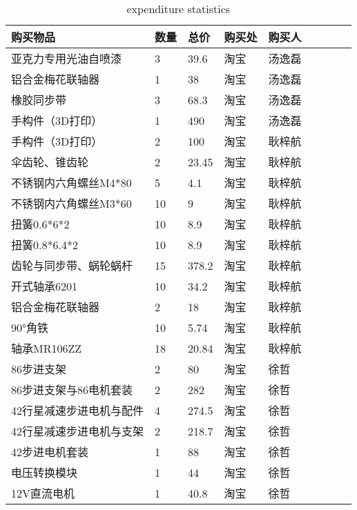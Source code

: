 
\begin{table}
    \centering
    \caption{expenditure statistics}
    \begin{tabular}{|l|l|l|l|l|l|l|l|l|}
    \hline
    
    购买物品 & 数量 & 总价 & 购买处 &购买人   \\ \hline
    亚克力专用光油自喷漆 & 3 & 39.6 & 淘宝 & 汤逸磊  \\ \hline
    铝合金梅花联轴器 & 1 & 38 & 淘宝  & 汤逸磊  \\ \hline
    橡胶同步带 & 3 & 68.3 & 淘宝  & 汤逸磊   \\ \hline
    手构件（3D打印） & 1 & 490 & 淘宝  & 汤逸磊   \\ \hline
    手构件（3D打印） & 2 & 100 & 淘宝  & 耿梓航   \\ \hline
    伞齿轮、锥齿轮 & 2 & 23.45 & 淘宝  & 耿梓航  \\ \hline
    不锈钢内六角螺丝M4*80 & 5 & 4.1 & 淘宝  & 耿梓航   \\ \hline
    不锈钢内六角螺丝M3*60 & 10 & 9 & 淘宝  & 耿梓航   \\ \hline
    扭簧0.6*6*2 & 10 & 8.9 & 淘宝  & 耿梓航   \\ \hline
    扭簧0.8*6.4*2 & 10 & 8.9 & 淘宝  & 耿梓航   \\ \hline
    齿轮与同步带、蜗轮蜗杆 & 15 & 378.2 & 淘宝  & 耿梓航   \\ \hline
    开式轴承6201 & 10 & 34.2 & 淘宝  & 耿梓航   \\ \hline
    铝合金梅花联轴器 & 2 & 18 & 淘宝  & 耿梓航   \\ \hline
    90°角铁 & 10 & 5.74 & 淘宝  & 耿梓航   \\ \hline
    轴承MR106ZZ & 18 & 20.84 & 淘宝  & 耿梓航   \\ \hline
    86步进支架 & 2 & 80 & 淘宝  & 徐哲   \\ \hline
    86步进支架与86电机套装 & 2 & 282 & 淘宝  & 徐哲  \\ \hline
    42行星减速步进电机与配件 & 4 & 274.5 & 淘宝  & 徐哲   \\ \hline
    42行星减速步进电机与支架 & 2 & 218.7 & 淘宝  & 徐哲   \\ \hline
    42步进电机套装 & 1 & 88 & 淘宝  & 徐哲   \\ \hline
    电压转换模块 & 1 & 44 & 淘宝  & 徐哲   \\ \hline
    12V直流电机 & 1 & 40.8 & 淘宝  & 徐哲   \\ \hline

\end{tabular}
\end{table}
